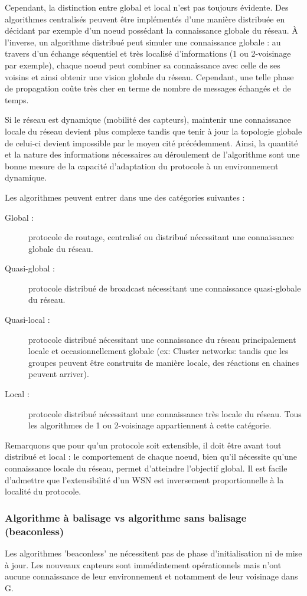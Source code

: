 Cependant, la distinction entre global et local n'est pas toujours évidente. Des algorithmes centralisés peuvent être implémentés d'une manière distribuée en décidant par exemple d'un noeud possédant la connaissance globale du réseau. À l'inverse, un algorithme distribué peut simuler une connaissance globale : au travers d'un échange séquentiel et très localisé d'informations  (1 ou 2-voisinage par exemple), chaque noeud peut combiner sa connaissance avec celle de ses voisins et ainsi obtenir une vision globale du réseau. Cependant, une telle phase de propagation coûte très cher en terme de nombre de messages échangés et de temps.

Si le réseau est dynamique (mobilité des capteurs), maintenir une connaissance locale du réseau devient plus complexe tandis que tenir à jour la topologie globale de celui-ci devient impossible par le moyen cité précédemment. Ainsi, la quantité et la nature des informations nécessaires au déroulement de l'algorithme sont une bonne mesure de la capacité d'adaptation du protocole à un environnement dynamique.   

Les algorithmes peuvent entrer dans une des catégories suivantes :
\begin{description}
 \item[Global :]protocole de routage, centralisé ou distribué nécessitant une connaissance globale du réseau.
 \item[Quasi-global :]protocole distribué de broadcast nécessitant une connaissance quasi-globale du réseau.
 \item[Quasi-local :]protocole distribué nécessitant une connaissance du réseau principalement locale et occasionnellement globale (ex: Cluster networks: tandis que les groupes peuvent être construits de manière locale, des réactions en chaines peuvent arriver).
 \item[Local :]protocole distribué nécessitant une connaissance très locale du réseau. Tous les algorithmes de 1 ou 2-voisinage appartiennent à cette catégorie.
\end{description}

Remarquons que pour qu'un protocole soit extensible, il doit être avant tout distribué et local :  le comportement de chaque noeud, bien qu'il nécessite qu'une connaissance locale du réseau, permet d'atteindre l'objectif global. Il est facile d'admettre que l'extensibilité d'un WSN est inversement proportionnelle à la localité du protocole.



\subsubsection{Algorithme à balisage vs algorithme sans balisage (beaconless)}
Les algorithmes 'beaconless' ne nécessitent pas de phase d'initialisation ni de mise à jour. Les nouveaux capteurs sont immédiatement opérationnels mais n'ont aucune connaissance de leur environnement et notamment de leur voisinage dans G. 

